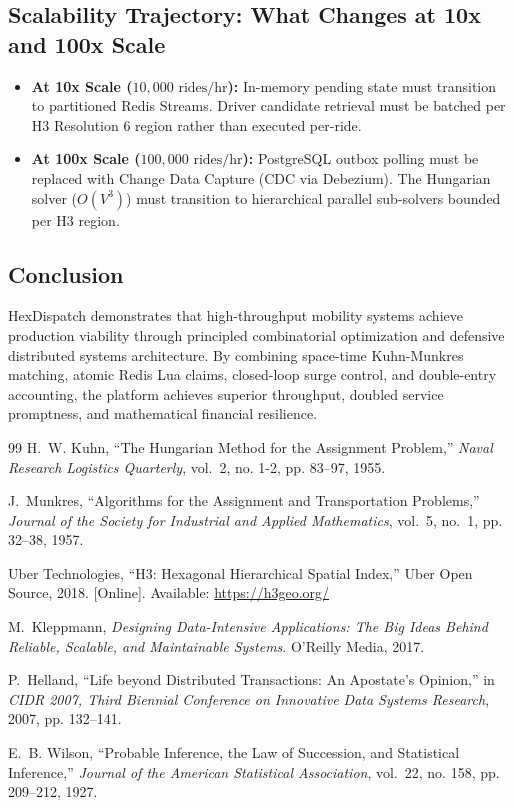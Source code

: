 \documentclass[11pt,a4paper]{article}
\begin{document}
\subsection{Scalability Trajectory: What Changes at 10x and 100x Scale}
\begin{itemize}[leftmargin=1.5em]
    \item \textbf{At 10x Scale ($10,000\text{ rides/hr}$):} In-memory pending state must transition to partitioned Redis Streams. Driver candidate retrieval must be batched per H3 Resolution 6 region rather than executed per-ride.
    \item \textbf{At 100x Scale ($100,000\text{ rides/hr}$):} PostgreSQL outbox polling must be replaced with Change Data Capture (CDC via Debezium). The Hungarian solver ($O(V^3)$) must transition to hierarchical parallel sub-solvers bounded per H3 region.
\end{itemize}

\subsection{Conclusion}
HexDispatch demonstrates that high-throughput mobility systems achieve production viability through principled combinatorial optimization and defensive distributed systems architecture. By combining space-time Kuhn-Munkres matching, atomic Redis Lua claims, closed-loop surge control, and double-entry accounting, the platform achieves superior throughput, doubled service promptness, and mathematical financial resilience.

\newpage
\begin{thebibliography}{99}
H.~W. Kuhn, ``The Hungarian Method for the Assignment Problem,'' \emph{Naval Research Logistics Quarterly}, vol.~2, no. 1-2, pp. 83--97, 1955.

J.~Munkres, ``Algorithms for the Assignment and Transportation Problems,'' \emph{Journal of the Society for Industrial and Applied Mathematics}, vol.~5, no.~1, pp. 32--38, 1957.

Uber Technologies, ``H3: Hexagonal Hierarchical Spatial Index,'' Uber Open Source, 2018. [Online]. Available: \url{https://h3geo.org/}

M.~Kleppmann, \emph{Designing Data-Intensive Applications: The Big Ideas Behind Reliable, Scalable, and Maintainable Systems}. O'Reilly Media, 2017.

P.~Helland, ``Life beyond Distributed Transactions: An Apostate's Opinion,'' in \emph{CIDR 2007, Third Biennial Conference on Innovative Data Systems Research}, 2007, pp. 132--141.

E.~B. Wilson, ``Probable Inference, the Law of Succession, and Statistical Inference,'' \emph{Journal of the American Statistical Association}, vol.~22, no. 158, pp. 209--212, 1927.
\end{thebibliography}
\end{document}
